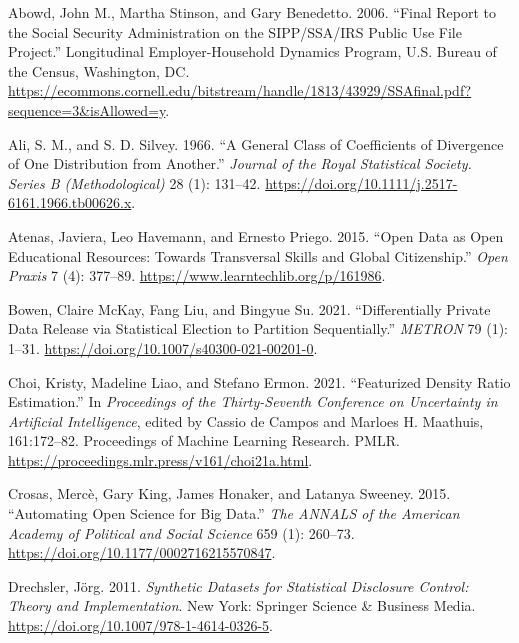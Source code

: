 \documentclass[
]{article}
\newlength{\cslhangindent}
\newlength{\cslentryspacingunit} %
\newenvironment{CSLReferences}[2] %
 {%
  \setlength{\parindent}{0pt}
  \ifodd #1
  \let\oldpar\par
  \def\par{\hangindent=\cslhangindent\oldpar}
  \fi
  \setlength{\parskip}{#2\cslentryspacingunit}
 }%
 {}
\begin{document}
\hypertarget{refs}{}
\begin{CSLReferences}{1}{0}
\leavevmode{}%
Abowd, John M., Martha Stinson, and Gary Benedetto. 2006. {``Final
Report to the Social Security Administration on the {SIPP/SSA/IRS}
Public Use File Project.''} Longitudinal Employer-Household Dynamics
Program, U.S. Bureau of the Census, Washington, DC.
\url{https://ecommons.cornell.edu/bitstream/handle/1813/43929/SSAfinal.pdf?sequence=3\&isAllowed=y}.

\leavevmode{}%
Ali, S. M., and S. D. Silvey. 1966. {``A General Class of Coefficients
of Divergence of One Distribution from Another.''} \emph{Journal of the
Royal Statistical Society. Series B (Methodological)} 28 (1): 131--42.
\url{https://doi.org/10.1111/j.2517-6161.1966.tb00626.x}.

\leavevmode{}%
Atenas, Javiera, Leo Havemann, and Ernesto Priego. 2015. {``Open Data as
Open Educational Resources: Towards Transversal Skills and Global
Citizenship.''} \emph{Open Praxis} 7 (4): 377--89.
\url{https://www.learntechlib.org/p/161986}.

\leavevmode{}%
Bowen, Claire McKay, Fang Liu, and Bingyue Su. 2021. {``Differentially
Private Data Release via Statistical Election to Partition
Sequentially.''} \emph{METRON} 79 (1): 1--31.
\url{https://doi.org/10.1007/s40300-021-00201-0}.

\leavevmode{}%
Choi, Kristy, Madeline Liao, and Stefano Ermon. 2021. {``Featurized
Density Ratio Estimation.''} In \emph{Proceedings of the Thirty-Seventh
Conference on Uncertainty in Artificial Intelligence}, edited by Cassio
de Campos and Marloes H. Maathuis, 161:172--82. Proceedings of Machine
Learning Research. PMLR.
\url{https://proceedings.mlr.press/v161/choi21a.html}.

\leavevmode{}%
Crosas, Mercè, Gary King, James Honaker, and Latanya Sweeney. 2015.
{``Automating Open Science for Big Data.''} \emph{The ANNALS of the
American Academy of Political and Social Science} 659 (1): 260--73.
\url{https://doi.org/10.1177/0002716215570847}.

\leavevmode{}%
Drechsler, Jörg. 2011. \emph{Synthetic Datasets for Statistical
Disclosure Control: Theory and Implementation}. New York: Springer
Science \& Business Media.
\url{https://doi.org/10.1007/978-1-4614-0326-5}.


\end{CSLReferences}
\end{document}
